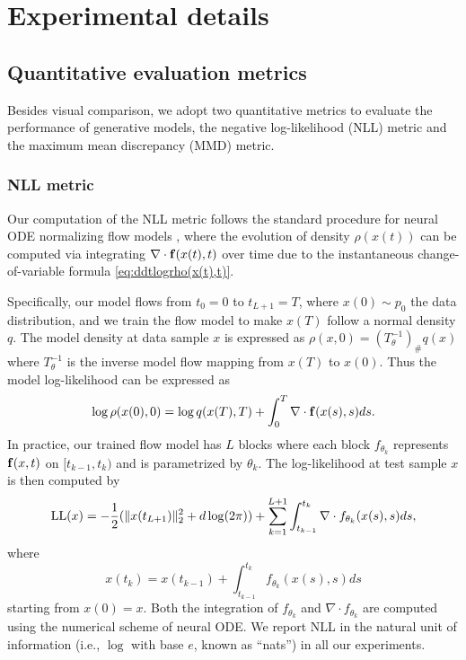 \documentclass{article}
\theoremstyle{remark}
\theoremstyle{plain}
\begin{document}
{\section{Experimental details}


\subsection{Quantitative evaluation metrics}\label{sec:metrics}

Besides visual comparison, we adopt two quantitative metrics to evaluate the performance of generative models,
the negative log-likelihood (NLL) metric \cite{FFJORD}
and  the maximum mean discrepancy (MMD) \citep{Gretton2012AKT} metric. 


\subsubsection{NLL metric} \label{sec:NLL}

Our computation of the NLL metric follows the standard procedure for neural ODE normalizing flow models \cite{chen2018neural,FFJORD},
where the evolution of density $\rho ( x(t) )$ can be computed via integrating $\nabla \cdot {\bf f}(x(t),t)$ over time due to the instantaneous change-of-variable formula \eqref{eq:ddtlogrho(x(t),t)}. 

Specifically, our model flows from $t_0 = 0$ to $t_{L+1} = T$, where $x(0) \sim p_0$ the data distribution,
and we train the flow model to make $x(T)$ follow a normal density $q$. The model density at data sample $x$ is expressed as $\rho(x,0) =  (T_{\theta}^{-1} )_\# q (x)$ where $T_{\theta}^{-1}$ is the inverse model  flow mapping from $x(T)$ to $x(0)$. Thus the model log-likelihood can be expressed as 
\[
\log \rho (x(0), 0)
= \log q( x(T), T) + \int_0^T \nabla \cdot {\bf f}(x(s),s) ds.
\]
In practice, our trained flow model has $L$ blocks where each block $f_{\theta_k}$ represents ${\bf f}(x,t)$ on $[t_{k-1},t_{k})$
and is parametrized by $\theta_k$.
The log-likelihood at test sample $x$ is then computed by
\begin{equation}\label{eq:NLL_simplified}
{\rm LL}(x)
= 
    -\frac{1}{2}(\|x(t_{L+1})\|^2_2+d\log(2\pi)) + \sum_{k=1}^{L+1} \int_{t_{k-1}}^{t_k} \nabla \cdot f_{\theta_k}(x(s),s)ds,
\end{equation}
where 
\[
x(t_k)=x(t_{k-1})+\int_{t_{k-1}}^{t_k} f_{\theta_k}(x(s),s)ds
\]
starting from $x(0) = x$. 
Both the integration of $f_{\theta_k}$ and $\nabla \cdot f_{\theta_k}$ are computed using the numerical scheme of neural ODE. 
We report NLL in the natural unit of information (i.e., $\log$ with base $e$, known as ``nats'') in all our experiments.



}
\end{document}
